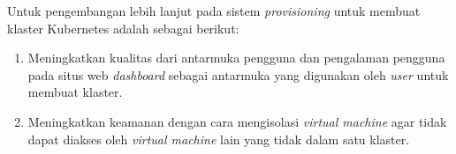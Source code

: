 Untuk pengembangan lebih lanjut pada sistem \emph{provisioning}
untuk membuat klaster Kubernetes adalah sebagai berikut:

\begin{enumerate}[nolistsep]

  \item Meningkatkan kualitas dari antarmuka pengguna dan pengalaman
    pengguna pada situs web \emph{dashboard} sebagai antarmuka
    yang digunakan oleh \emph{user} untuk membuat klaster.

  \item Meningkatkan keamanan dengan cara mengisolasi \emph{virtual machine}
    agar tidak dapat diakses oleh \emph{virtual machine} lain yang tidak
    dalam satu klaster.

\end{enumerate}
